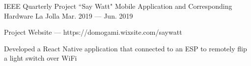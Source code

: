 \begin{cventries}
\cventry
    {IEEE Quarterly Project} %
    {``Say Watt" Mobile Application and Corresponding Hardware} %
    {La Jolla} %
    {Mar. 2019 — Jun. 2019} %
    {
      \begin{cvitems} %
        \item {Project Website — https://domogami.wixsite.com/saywatt}
        \item {Developed a React Native application that connected to an ESP to remotely flip a light switch over WiFi}
      \end{cvitems}
    }
\end{cventries}
